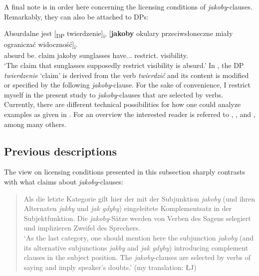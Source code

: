 \documentclass[output=paper
,modfonts
,nonflat]{langsci/langscibook}
\begin{document}
A final note is in order here concerning the licensing conditions of \emph{jakoby}-clauses. Remarkably, they can also be attached to DPs:

\ea \gll Absurdalne jest [\textsubscript{DP} twierdzenie]\textsubscript{i}, [\textbf{jakoby} {okulary przeciwsłoneczne} miały ograniczać widoczność]\textsubscript{i}. \label{DP} \\
		absurd be.{\thirdperson}{\sg} {} claim jakoby sunglasses have.{\lptcp}.{\nvir}.{\pl}  restrict.{\infv} visibility.{\acc} \\
\glt	`The claim that sunglasses supposedly restrict visibility is absurd.' 
\z
In , the DP \emph{twierdzenie} `claim' is derived from the verb \emph{twierdzić} and its content is modified or specified by the following \emph{jakoby}-clause. For the sake of convenience, I restrict myself in the present study to \emph{jakoby}-clauses that are selected by verbs. Currently, there are different technical possibilities for how one could analyze examples as given in . For an overview the interested reader is referred to \textcite{Moulton2009}, \textcite{Haegeman-Urogdi2010}, and \textcite{deCuba2017}, among many others.

\subsection{Previous descriptions}

The view on licensing conditions presented in this subsection sharply contrasts with what \textcite[110--115, 156--157]{Taborek2008} claims about \emph{jakoby}-clauses:

\begin{quote}
Als die letzte Kategorie gilt hier der mit der Subjunktion \emph{jakoby} (und ihren Alternaten \emph{jakby} und \emph{jak gdyby}) eingeleitete Komplementsatz in der Subjekt\-funktion. Die \emph{jakoby}-Sätze werden von Verben des Sagens selegiert und implizieren Zweifel des Sprechers. \\ `As the last category, one should mention here the subjunction \emph{jakoby} (and its alternative subjunctions \emph{jakby} and \emph{jak gdyby}) introducing complement clauses in the subject position. The \emph{jakoby}-clauses are selected by verbs of saying and imply speaker's doubts.' (my translation: ŁJ)   \newline \textcite[100--101]{Taborek2008}
\end{quote}
\end{document}
